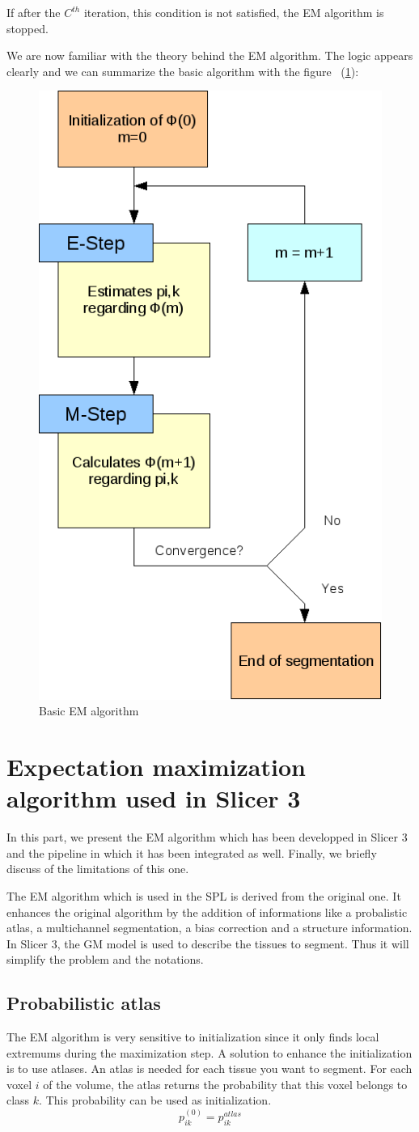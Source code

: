 If after the $C^{th}$ iteration, this condition is not satisfied, the EM algorithm is stopped. \\

 
  \par
  We are now familiar with the theory behind the EM algorithm. The logic appears clearly and we can summarize the basic algorithm with the figure ~(\ref{fig:EMAlgorithm}):
   
  \begin{figure}[ht]\centering
  \includegraphics[width=.4\textwidth]{Images/Graphics/EMSimple.png}
  \caption{Basic EM algorithm}\label{fig:EMAlgorithm}
  \end{figure}

\section{Expectation maximization algorithm used in Slicer 3}\label{angels}
In this part, we present the EM algorithm which has been developped in Slicer 3 and the pipeline in which it has been integrated as well. Finally, we briefly discuss of the limitations of this one.
\par
The EM algorithm which is used in the SPL is derived from the original one. It enhances the original algorithm by the addition of informations like a probalistic atlas, a multichannel segmentation, a bias correction and a structure information. In Slicer 3, the GM model is used to describe the tissues to segment. Thus it will simplify the problem and the notations.
%
\subsection{Probabilistic atlas}\label{spatial}
The EM algorithm is very sensitive to initialization since it only finds local extremums during the maximization step. A solution to enhance the initialization is to use atlases. An atlas is needed for each tissue you want to segment. For each voxel $i$ of the volume, the atlas returns the probability that this voxel belongs to class $k$. This probability can be used as initialization.
  \begin{equation*}
  p_{ik}^{(0)} = p_{ik}^{atlas}
  \end{equation*}   

